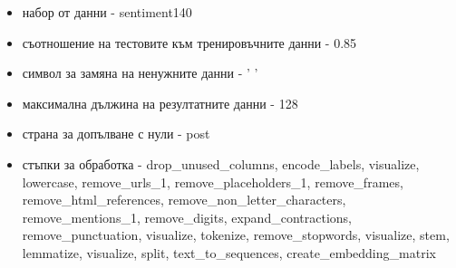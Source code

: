 \documentclass{article}
\begin{document}
\begin{itemize}
\begin{itemize}
\item набор от данни - sentiment140
\item съотношение на тестовите към тренировъчните данни - 0.85
\item символ за замяна на ненужните данни - ' '
\item максимална дължина на резултатните данни - 128
\item страна за допълване с нули - post
\item стъпки за обработка - drop\_unused\_columns, encode\_labels, visualize, lowercase, remove\_urls\_1,
remove\_placeholders\_1, remove\_frames, remove\_html\_references, remove\_non\_letter\_characters,
remove\_mentions\_1, remove\_digits, expand\_contractions, remove\_punctuation, visualize, tokenize,
remove\_stopwords, visualize, stem, lemmatize, visualize, split, text\_to\_sequences, create\_embedding\_matrix
\end{itemize}


\end{itemize}
\end{document}
